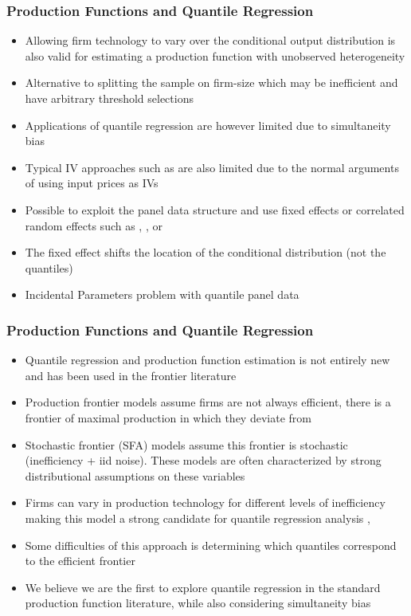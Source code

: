 \documentclass{beamer}
\begin{document}
\begin{frame}
\frametitle{Production Functions and Quantile Regression}
\begin{itemize}
	\item Allowing firm technology to vary over the conditional output distribution is also valid for estimating a production function with unobserved heterogeneity
	\item Alternative to splitting the sample on firm-size which may be inefficient and have arbitrary threshold selections
	\item Applications of quantile regression are however limited due to simultaneity bias
	\item Typical IV approaches such as \textcite{Chernozhukov2005} are also limited due to the normal arguments of using input prices as IVs
	\item Possible to exploit the panel data structure and use fixed effects or correlated random effects such as \textcite{Koenker2004}, \textcite{Lamarche2010}, or \textcite{Canay2011}
	\item The fixed effect shifts the location of the conditional distribution (not the quantiles)
	\item Incidental Parameters problem with quantile panel data
\end{itemize}
\end{frame}


\begin{frame}
\frametitle{Production Functions and Quantile Regression}
\begin{itemize}
	\item Quantile regression and production function estimation is not entirely new and has been used in the frontier literature
	\item Production frontier models assume firms are not always efficient, there is a frontier of maximal production in which they deviate from
	\item Stochastic frontier (SFA) models assume this frontier is stochastic (inefficiency + iid noise). These models are often characterized by strong distributional assumptions on these variables
	\item Firms can vary in production technology for different levels of inefficiency making this model a strong candidate for quantile regression analysis \parencite{Bernini2004}, \parencite{Liu2008}
	\item Some difficulties of this approach is determining which quantiles correspond to the efficient frontier
	\item We believe we are the first to explore quantile regression in the standard production function literature, while also considering simultaneity bias
\end{itemize}
\end{frame}
\end{document}
